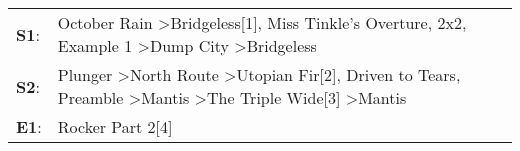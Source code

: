 \begin{supertabular}{p{0.03\textwidth}p{0.92\textwidth}}
 \textbf{S1}:  &                                                              October Rain\textsuperscript{} \textgreater \enspace Bridgeless[1]\textsuperscript{}, \enspace Miss Tinkle's Overture\textsuperscript{}, \enspace 2x2\textsuperscript{}, \enspace Example 1\textsuperscript{} \textgreater \enspace Dump City\textsuperscript{} \textgreater \enspace Bridgeless\textsuperscript{}  \enspace  \\
 \textbf{S2}:  &  Plunger\textsuperscript{} \textgreater \enspace North Route\textsuperscript{} \textgreater \enspace Utopian Fir[2]\textsuperscript{}, \enspace Driven to Tears\textsuperscript{}, \enspace Preamble\textsuperscript{} \textgreater \enspace Mantis\textsuperscript{} \textgreater \enspace The Triple Wide[3]\textsuperscript{} \textgreater \enspace Mantis\textsuperscript{}  \enspace  \\
 \textbf{E1}:  &                                                                                                                                                                                                                                                                                                                                              Rocker Part 2[4]\textsuperscript{}  \enspace  \\
\end{supertabular}
